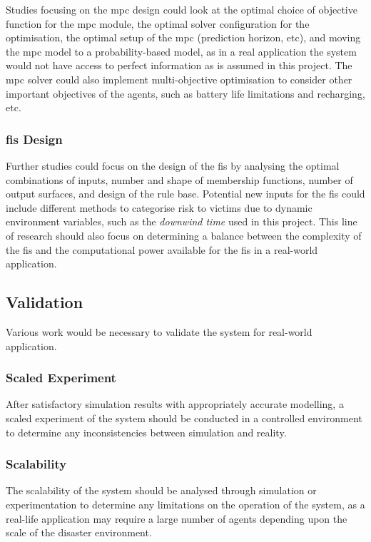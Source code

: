 \documentclass[conference]{IEEEtran}
\begin{document}
Studies focusing on the \gls{mpc} design could look at the optimal choice of objective function for the \gls{mpc} module, the optimal solver configuration for the optimisation, the optimal setup of the \gls{mpc} (prediction horizon, etc), and moving the \gls{mpc} model to a probability-based model, as in a real application the system would not have access to perfect information as is assumed in this project.
The \gls{mpc} solver could also implement multi-objective optimisation to consider other important objectives of the agents, such as battery life limitations and recharging, etc.

\subsubsection{\gls{fis} Design}
Further studies could focus on the design of the \gls{fis} by analysing the optimal combinations of inputs, number and shape of membership functions, number of output surfaces, and design of the rule base.
Potential new inputs for the \gls{fis} could include different methods to categorise risk to victims due to dynamic environment variables, such as the \textit{downwind time} used in this project.
This line of research should also focus on determining a balance between the complexity of the \gls{fis} and the computational power available for the \gls{fis} in a real-world application.

\subsection{Validation}

Various work would be necessary to validate the system for real-world application.

\subsubsection{Scaled Experiment}

After satisfactory simulation results with appropriately accurate modelling, a scaled experiment of the system should be conducted in a controlled environment to determine any inconsistencies between simulation and reality.
  
\subsubsection{Scalability}

The scalability of the system should be analysed through simulation or experimentation to determine any limitations on the operation of the system, as a real-life application may require a large number of agents depending upon the scale of the disaster environment.
\end{document}
